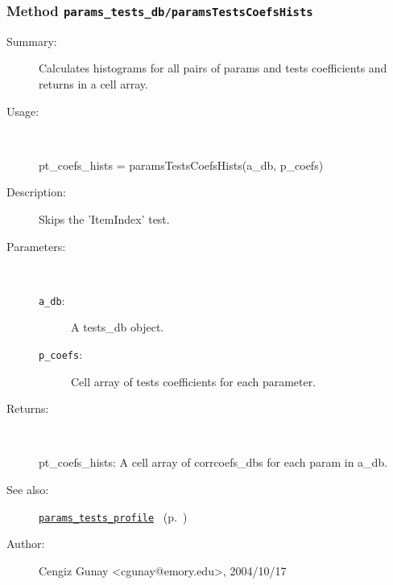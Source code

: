 \subsubsection[Method \texttt{paramsTestsCoefsHists}]{Method \texttt{params\_tests\_db/paramsTestsCoefsHists}}%
%
\label{ref_params_tests_db__paramsTestsCoefsHists}%
\hypertarget{ref_params_tests_db__paramsTestsCoefsHists}{}%
\begin{description}
\item[Summary:]Calculates histograms for all pairs of params 
		  and tests coefficients and returns in a cell array.
%
\item[Usage:]~%
\begin{lyxcode}%
pt\_coefs\_hists = paramsTestsCoefsHists(a\_db, p\_coefs)
%
\end{lyxcode}%
%
\item[Description:]%
Skips the 'ItemIndex' test.
\item[Parameters:]~
\begin{description}%
\item[\texttt{a\_db}:]
 A tests\_db object.
\item[\texttt{p\_coefs}:]
 Cell array of tests coefficients for each parameter.
\end{description}%
%
\item[Returns:
]~

	pt\_coefs\_hists: A cell array of corrcoefs\_dbs for each param in a\_db.
%
%
\item[See also:]%
\hyperlink{ref_params_tests_profile}{\texttt{params\_tests\_profile}}%
\ (p.~\pageref{ref_params_tests_profile})%
%
%
\item[Author:]%
Cengiz Gunay <cgunay@emory.edu>, 2004/10/17
%
\end{description}
\methodline%
